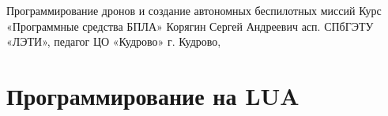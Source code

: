 \documentclass[
    fontsize=14pt, 
    DIV=12,
    headings=big,
    numbers=noenddot,
    toc=listof,      %
    toc=bib,         %
    headinclude=true,%
    footinclude=false
]{scrartcl}
\begin{document}
\makePioneerTitle
    {Программирование дронов и создание автономных беспилотных миссий}
    {Курс «Программные средства БПЛА»}
    {Корягин Сергей Андреевич}
    {асп. СПбГЭТУ «ЛЭТИ», педагог ЦО «Кудрово»}
    {г. Кудрово, \the\year}

\tableofcontents
\clearpage



\clearpage


\clearpage


\clearpage

\part{Программирование на LUA}








\clearpage





















\clearpage
\end{document}
